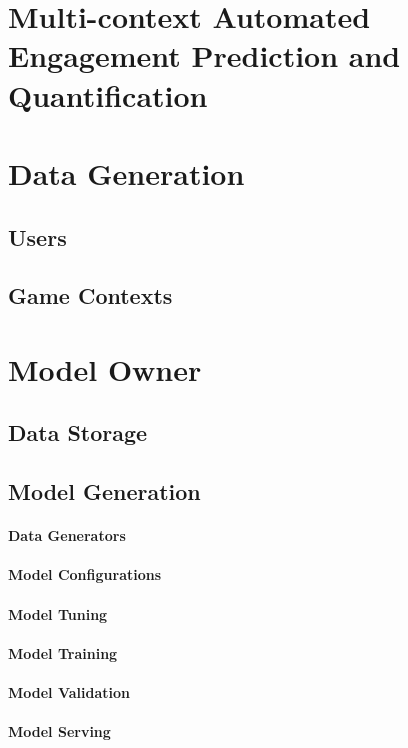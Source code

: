 \section{Multi-context Automated Engagement Prediction and Quantification}
\label{industry_needs}

\section{Data Generation}
\lorem
\subsection{Users}
\lorem
\subsection{Game Contexts}
\lorem

\section{Model Owner}
\lorem
\subsection{Data Storage}
\lorem
\subsection{Model Generation}
\lorem
\paragraph*{Data Generators} \lorem
\paragraph*{Model Configurations} \lorem
\paragraph*{Model Tuning} \lorem
\paragraph*{Model Training} \lorem
\paragraph*{Model Validation} \lorem
\paragraph*{Model Serving} \lorem

